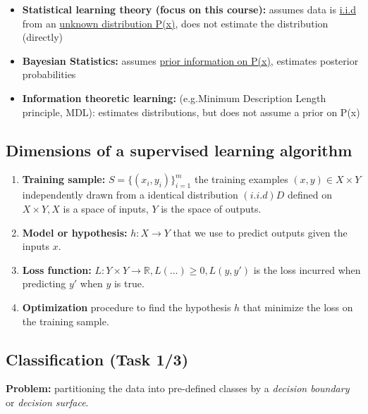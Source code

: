 \documentclass[12pt, a4paper]{article}
\begin{document}
\begin{itemize}
\item
  \textbf{\textcolor[HTML]{7EAA55}{Statistical learning theory (focus on this course)}:} assumes
  data is \uline{i.i.d} from an \uline{unknown distribution P(x)}, does not estimate the
  distribution (directly)
\item
  \textbf{\textcolor[HTML]{F5C342}{Bayesian Statistics}:} assumes \uline{prior information on P(x)}, estimates posterior probabilities
\item
  \textbf{\textcolor[HTML]{DE8344}{Information theoretic learning}:} (e.g.Minimum Description Length principle, MDL):
  estimates distributions, but does not assume a prior on P(x)

\end{itemize}

\subsection{Dimensions of a supervised learning algorithm
}\label{dimensions-of-a-supervised-learning-algorithm}

\begin{enumerate}
\def\labelenumi{\arabic{enumi}.}
\item
  \textbf{Training sample:} $S = \{(x_i, y_i)\}^m_{i=1}$ the training
  examples $(x, y) \in X \times Y$ independently drawn from a identical
  distribution $(i.i.d) D$ defined on $X \times Y, X$ is a space of inputs,
  $Y$ is the space of outputs.
\item
  \textbf{Model or hypothesis:} $h : X \rightarrow Y$ that we use to predict
  outputs given the inputs $x$.
\item
  \textbf{Loss function:} $L : Y \times Y \rightarrow \mathbb{R}, L(...) \geq 0, L(y, y')$ is the
  loss incurred when predicting $y'$ when $y$ is true.
\item
  \textbf{Optimization} procedure to find the hypothesis $h$ that
  minimize the loss on the training sample.
\end{enumerate}



\subsection{Classification (Task 1/3)}

\textbf{Problem:} partitioning the data into pre-defined classes by a
\emph{decision boundary} or \emph{decision surface}.
\end{document}
